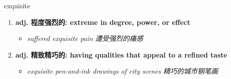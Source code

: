 
\begin{frame}
{\huge exquisite}
\begin{center}
\begin{enumerate}\Large
  \item \textbf{adj. 程度强烈的: extreme in degree, power, or effect}
  \begin{itemize}
    \item \em{\Large{suffered exquisite pain 遭受强烈的痛感}}
  \end{itemize}
  \item \textbf{adj. 精致精巧的: having qualities that appeal to a refined taste}
  \begin{itemize}
    \item \em{\Large{exquisite pen-and-ink drawings of city scenes 精巧的城市钢笔画}}
  \end{itemize}
\end{enumerate}
\end{center}
\end{frame}
